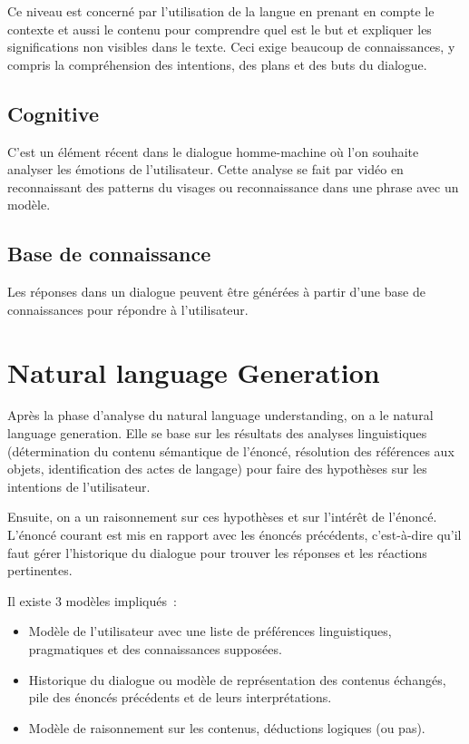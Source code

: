 	Ce niveau est concerné par l'utilisation de la langue en prenant en compte le contexte et aussi le contenu pour comprendre quel est le but et expliquer les significations non visibles dans le texte. Ceci exige beaucoup de connaissances, y compris la compréhension des intentions, des plans et des buts du dialogue.
\subsection{Cognitive}

C’est un élément récent dans le dialogue homme-machine où l’on souhaite analyser les émotions de l’utilisateur. Cette analyse se fait par vidéo en reconnaissant des patterns du visages ou reconnaissance dans une phrase avec un modèle.

\subsection{Base de connaissance}

Les réponses dans un dialogue peuvent être générées à partir d’une base de connaissances pour répondre à l’utilisateur.


\section{Natural language Generation}


Après la phase d’analyse du natural language understanding, on a le natural language generation. Elle se base sur les résultats des analyses linguistiques (détermination du contenu sémantique de l’énoncé, résolution des références aux objets, identification des actes de langage) pour faire des hypothèses sur les intentions de l’utilisateur. 
\vspace{1em}

	Ensuite, on a un raisonnement sur ces hypothèses et sur l’intérêt de l’énoncé. L’énoncé courant est mis en rapport avec les énoncés précédents, c’est-à-dire qu’il faut gérer l’historique du dialogue pour trouver les réponses et les réactions pertinentes. 
	\vspace{1em}
	
Il existe 3 modèles impliqués :
\vspace{1em} 
\begin{itemize}
	\item Modèle de l’utilisateur avec une liste de préférences linguistiques, pragmatiques et des connaissances supposées.
	\item Historique du dialogue ou modèle de représentation des contenus échangés, pile des énoncés précédents et de leurs interprétations.
	\item Modèle de raisonnement sur les contenus, déductions logiques (ou pas).
\end{itemize}

